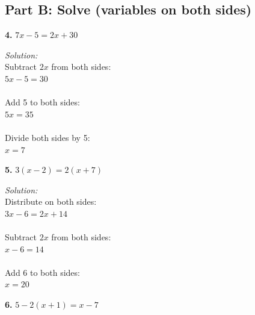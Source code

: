 \documentclass[12pt]{article}
\begin{document}

                \newpage

        \subsection*{Part B: Solve (variables on both sides)}

            \textbf{4.} $7x - 5 = 2x + 30$

                \textit{Solution:}\\
                Subtract $2x$ from both sides:\\
                $5x - 5 = 30$\\
                \\
                Add 5 to both sides:\\
                $5x = 35$\\
                \\
                Divide both sides by 5:\\
                $x = 7$


                \vspace{0.5cm}

            \textbf{5.} $3(x - 2) = 2(x + 7)$

                \textit{Solution:}\\
                Distribute on both sides:\\
                $3x - 6 = 2x + 14$\\
                \\
                Subtract $2x$ from both sides:\\
                $x - 6 = 14$\\
                \\
                Add 6 to both sides:\\
                $x = 20$


                \newpage

            \textbf{6.} $5 - 2(x + 1) = x - 7$
\end{document}
